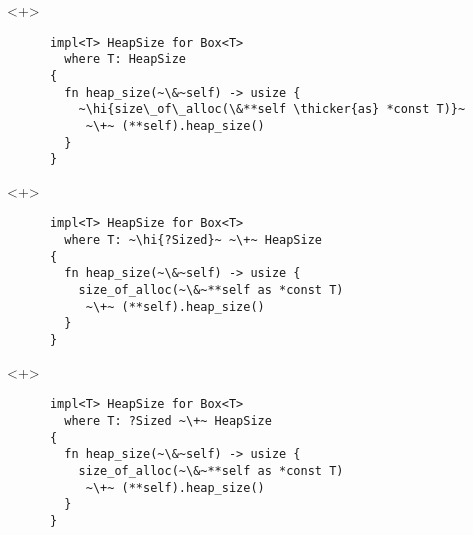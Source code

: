\documentclass[usepdftitle=false]{beamer}
\renewcommand{\&}{\makebox[\widthof{\ampersand}][c]{\scalebox{0.9}[1.0]{\Book\ampersand}}}
\newcommand{\+}{\makebox[\widthof{+}][c]{\raisebox{-.2\height}{\scalefont{1.5}\Light+}}}
\newcommand{\thicker}[1]{\contourlength{0.26pt}\contour[10]{black}{#1}}
\newcommand{\hi}[1]{%
\tikz[baseline=(A.base)]
 \node[highlighting=0,inner sep=0pt,text depth=0pt] (A) {#1};%
}
\begin{document}
\begin{frame}[fragile]
\begin{onlyenv}
  \end{onlyenv}
  \begin{onlyenv}<+>
    \begin{verbatim}
      impl<T> HeapSize for Box<T>
        where T: HeapSize
      {
        fn heap_size(~\&~self) -> usize {
          ~\hi{size\_of\_alloc(\&**self \thicker{as} *const T)}~
           ~\+~ (**self).heap_size()
        }
      }
    \end{verbatim}
  \end{onlyenv}
  \begin{onlyenv}<+>
    \begin{verbatim}
      impl<T> HeapSize for Box<T>
        where T: ~\hi{?Sized}~ ~\+~ HeapSize
      {
        fn heap_size(~\&~self) -> usize {
          size_of_alloc(~\&~**self as *const T)
           ~\+~ (**self).heap_size()
        }
      }
    \end{verbatim}
  \end{onlyenv}
  \begin{onlyenv}<+>
    \begin{verbatim}
      impl<T> HeapSize for Box<T>
        where T: ?Sized ~\+~ HeapSize
      {
        fn heap_size(~\&~self) -> usize {
          size_of_alloc(~\&~**self as *const T)
           ~\+~ (**self).heap_size()
        }
      }
    \end{verbatim}
  \end{onlyenv}
\end{frame}
\end{document}

